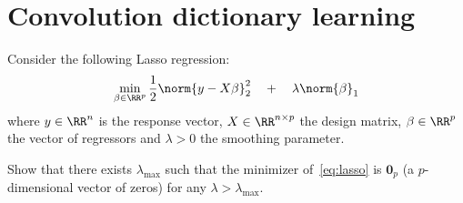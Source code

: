 \documentclass[11pt]{article}
\begin{document}
\section{Convolution dictionary learning}

\begin{exercise}
Consider the following Lasso regression:
\begin{equation}\label{eq:lasso}
    \min_{\beta\in\RR^p} \frac{1}{2}\norm{y-X\beta}^2_2 \quad + \quad \lambda \norm{\beta}_1
\end{equation}
where $y\in\RR^n$ is the response vector, $X\in\RR^{n\times p}$ the design matrix, $\beta\in\RR^p$ the vector of regressors and $\lambda>0$ the smoothing parameter.

Show that there exists $\lambda_{\max}$ such that the minimizer of~\eqref{eq:lasso} is $\mathbf{0}_p$ (a $p$-dimensional vector of zeros) for any $\lambda > \lambda_{\max}$. 
\end{exercise}
\end{document}
